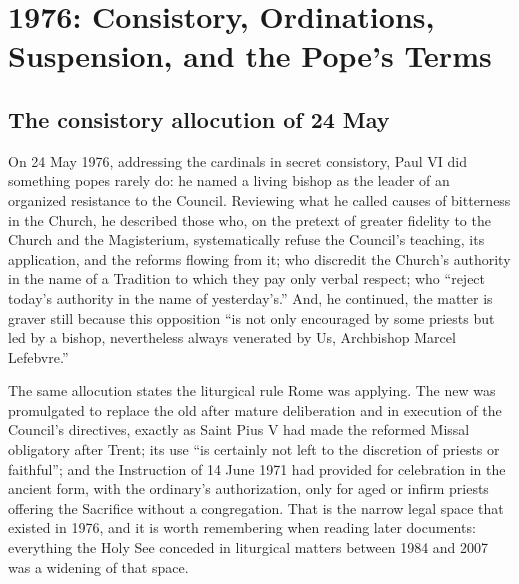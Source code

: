 \section{1976: Consistory, Ordinations, Suspension, and the Pope's Terms}

\subsection{The consistory allocution of 24 May}

On 24 May 1976, addressing the cardinals in secret consistory, Paul VI
did something popes rarely do: he named a living bishop as the leader of
an organized resistance to the Council. Reviewing what he called causes
of bitterness in the Church, he described those who, on the pretext of
greater fidelity to the Church and the Magisterium, systematically refuse
the Council's teaching, its application, and the reforms flowing from it;
who discredit the Church's authority in the name of a Tradition to which
they pay only verbal respect; who ``reject today's authority in the name
of yesterday's.'' And, he continued, the matter is graver still because
this opposition ``is not only encouraged by some priests but led by a
bishop, nevertheless always venerated by Us, Archbishop Marcel
Lefebvre.''

The same allocution states the liturgical rule Rome was applying. The
new  was promulgated to replace the old after mature
deliberation and in execution of the Council's directives, exactly as
Saint Pius V had made the reformed Missal obligatory after Trent; its
use ``is certainly not left to the discretion of priests or faithful'';
and the Instruction of 14 June 1971 had provided for celebration in the
ancient form, with the ordinary's authorization, only for aged or infirm
priests offering the Sacrifice without a congregation. That is the narrow legal
space that existed in 1976, and it is worth remembering when reading
later documents: everything the Holy See conceded in liturgical matters
between 1984 and 2007 was a widening of that space.

